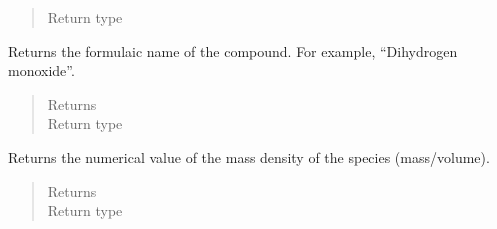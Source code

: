 \documentclass[letterpaper,10pt,openany,oneside,english]{sphinxmanual}
\begin{document}
\begin{fulllineitems}
\begin{fulllineitems}
\begin{quote}
\begin{description}
\item[{Return type}] \leavevmode
{}

\end{description}\end{quote}

\end{fulllineitems}


\begin{fulllineitems}
\label{\detokenize{support_rst/specie:specie.Specie.GetFormulaName}}
Returns the formulaic name of the compound. For example, “Dihydrogen
monoxide”.
\begin{quote}\begin{description}
\item[{Returns}] \leavevmode
{}

\item[{Return type}] \leavevmode
{}

\end{description}\end{quote}

\end{fulllineitems}


\begin{fulllineitems}
\label{\detokenize{support_rst/specie:specie.Specie.GetMassCC}}
Returns the numerical value of the mass density of the species
(mass/volume).
\begin{quote}\begin{description}
\item[{Returns}] \leavevmode
{}

\item[{Return type}] \leavevmode
{}

\end{description}\end{quote}

\end{fulllineitems}



\end{fulllineitems}
\end{document}
